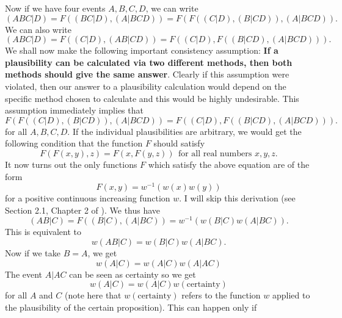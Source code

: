\documentclass{scrartcl}
\begin{document}
Now if we have four events $A, B, C, D$, we can write
\begin{equation*}
  (ABC|D) = F((BC|D), (A|BCD)) = F(F((C|D), (B|CD)), (A|BCD)). 
\end{equation*}
We can also write
\begin{equation*}
  (ABC|D) = F((C|D), (AB|CD)) = F((C|D), F((B|CD), (A|BCD))). 
\end{equation*}
We shall now make the following important consistency assumption:
\textbf{If a plausibility can be calculated via two different methods,
then both methods  should give the same answer}. Clearly if this
assumption were violated, then our answer to a plausibility
calculation would depend on the specific method chosen to calculate
and this would be highly undesirable. This assumption immediately
implies that
\begin{equation*}
  F(F((C|D), (B|CD)), (A|BCD)) = F((C|D), F((B|CD), (A|BCD))). 
\end{equation*}
for all $A, B, C, D$. If the individual plausibilities are arbitrary,
we would get the following condition that the function $F$ should
satisfy
\begin{equation*}
  F(F(x, y), z) = F(x, F(y, z)) ~~ \text{for all real numbers $x, y, z$}. 
\end{equation*}
It now turns out the only functions $F$ which satisfy the above
equation are of the form
\begin{equation*}
  F(x, y) = w^{-1}(w(x) w(y))
\end{equation*}
for a positive continuous increasing function $w$. I will skip this
derivation (see Section 2.1, Chapter 2 of \citet{Jaynes}). We thus have
\begin{equation}\label{abc}
  (AB|C) = F((B|C), (A|BC)) = w^{-1} \left(w(B|C) w(A|BC) \right). 
\end{equation}
This is equivalent to
\begin{equation*}
  w(AB|C) = w(B|C) w(A|BC). 
\end{equation*}
Now if we take $B = A$, we get
\begin{equation*}
  w(A|C) = w(A|C) w(A|AC)
\end{equation*}
The event $A|AC$ can be seen as certainty so we get
\begin{equation*}
  w(A|C) = w(A|C) w(\text{certainty})
\end{equation*}
for all $A$ and $C$ (note here that $w(\text{certainty})$ refers to
the function $w$ applied to the plausibility of the certain
proposition). This can happen only if 
\end{document}
